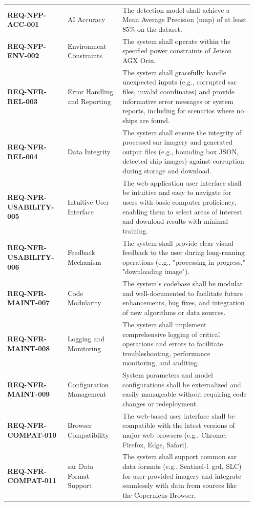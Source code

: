 \documentclass{article}
\begin{document}
\begin{longtable}{>{\bfseries}p{4.5cm}p{3.5cm}p{6.5cm}}
		REQ-NFP-ACC-001 & AI Accuracy & The detection model shall achieve a Mean Average Precision (\acrshort{map}) of at least 85\% on the dataset. \\
		REQ-NFP-ENV-002 & Environment Constraints & The system shall operate within the specified power constraints of Jetson AGX Orin. \\
		REQ-NFR-REL-003 & Error Handling and Reporting & The system shall gracefully handle unexpected inputs (e.g., corrupted \acrshort{sar} files, invalid coordinates) and provide informative error messages or system reports, including for scenarios where no ships are found. \\
		REQ-NFR-REL-004 & Data Integrity & The system shall ensure the integrity of processed \acrshort{sar} imagery and generated output files (e.g., bounding box JSON, detected ship images) against corruption during storage and download. \\
		REQ-NFR-USABILITY-005 & Intuitive User Interface & The web application user interface shall be intuitive and easy to navigate for users with basic computer proficiency, enabling them to select areas of interest and download resu\acrshort{lts} with minimal training. \\
		REQ-NFR-USABILITY-006 & Feedback Mechanism & The system shall provide clear visual feedback to the user during long-running operations (e.g., "processing in progress," "downloading image"). \\
		REQ-NFR-MAINT-007 & Code Modularity & The system's codebase shall be modular and well-documented to facilitate future enhancements, bug fixes, and integration of new algorithms or data sources. \\
		REQ-NFR-MAINT-008 & Logging and Monitoring & The system shall implement comprehensive logging of critical operations and errors to facilitate troubleshooting, performance monitoring, and auditing. \\
		REQ-NFR-MAINT-009 & Configuration Management & System parameters and model configurations shall be externalized and easily manageable without requiring code changes or redeployment. \\
		REQ-NFR-COMPAT-010 & Browser Compatibility & The web-based user interface shall be compatible with the latest versions of major web browsers (e.g., Chrome, Firefox, Edge, Safari). \\
		REQ-NFR-COMPAT-011 & \acrshort{sar} Data Format Support & The system shall support common \acrshort{sar} data formats (e.g., Sentinel-1 \acrshort{grd}, SLC) for user-provided imagery and integrate seamlessly with data from sources like the Copernicus Browser. \\

\end{longtable}
\end{document}
